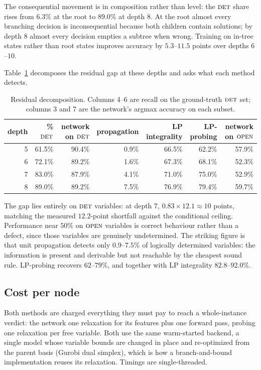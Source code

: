 \documentclass[11pt]{article}
\newcommand{\FORCED}{\textsc{det}}
\newcommand{\FREE}{\textsc{open}}
\begin{document}
The consequential movement is in composition rather than level: the $\FORCED$ share rises from $6.3\%$ at the root to $89.0\%$ at depth $8$. At the root almost every branching decision is inconsequential because both children contain solutions; by depth $8$ almost every decision empties a subtree when wrong. Training on in-tree states rather than root states improves accuracy by $5.3$--$11.5$ points over depths $6$--$10$.

Table~\ref{tab:gap} decomposes the residual gap at these depths and asks what each method detects.

\begin{table}[h]
\centering
\begin{tabular}{rrrrrrr}
\toprule
depth & \% $\FORCED$ & network on $\FORCED$ & propagation & LP integrality & LP-probing & network on $\FREE$ \\
\midrule
5 & 61.5\% & 90.4\% & 0.9\% & 66.5\% & 62.2\% & 57.9\% \\
6 & 72.1\% & 89.2\% & 1.6\% & 67.3\% & 68.1\% & 52.3\% \\
7 & 83.0\% & 87.9\% & 4.1\% & 71.0\% & 75.0\% & 52.9\% \\
8 & 89.0\% & 89.2\% & 7.5\% & 76.9\% & 79.4\% & 59.7\% \\
\bottomrule
\end{tabular}
\caption{Residual decomposition. Columns 4--6 are recall on the ground-truth $\FORCED$ set; columns 3 and 7 are the network's argmax accuracy on each subset.}
\label{tab:gap}
\end{table}

The gap lies entirely on $\FORCED$ variables: at depth $7$, $0.83\times12.1\approx10$ points, matching the measured $12.2$-point shortfall against the conditional ceiling. Performance near $50\%$ on $\FREE$ variables is correct behaviour rather than a defect, since those variables are genuinely undetermined. The striking figure is that unit propagation detects only $0.9$--$7.5\%$ of logically determined variables: the information is present and derivable but not reachable by the cheapest sound rule. LP-probing recovers $62$--$79\%$, and together with LP integrality $82.8$--$92.0\%$.

\subsection{Cost per node}
\label{sec:exp-cost}

Both methods are charged everything they must pay to reach a whole-instance verdict: the network one relaxation for its features plus one forward pass, probing one relaxation per free variable. Both use the same warm-started backend, a single model whose variable bounds are changed in place and re-optimized from the parent basis (Gurobi dual simplex), which is how a branch-and-bound implementation reuses its relaxation. Timings are single-threaded.
\end{document}
